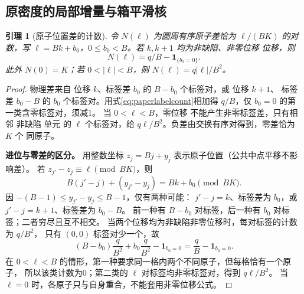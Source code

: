 \documentclass[UTF8,a4paper,11pt,fontset=fandol]{ctexart}
\newtheorem{lemma}{引理}[section]
\theoremstyle{remark}
\begin{document}
\subsection{原密度的局部增量与箱平滑核}
\begin{lemma}[原子位置差的计数]\label{lem:paperphysicalcount}
令 $N(\ell)$ 为圆周有序原子差恰为 $\ell/(BK)$ 的对数，写
$\ell=Bk+b_0$，$0\le b_0<B$。若 $k,k+1$ 均为非缺陷、非零位移 位移，则
\[
 N(\ell)=q/B-\mathbf1_{\{b_0=0\}}.
\]
此外 $N(0)=K$；若 $0<|\ell|<B$，则 $N(\ell)=q|\ell|/B^2$。
\end{lemma}
\begin{proof}
物理差来自 位移 $k$、标签差 $b_0$ 的 $B-b_0$ 个标签对，或 位移 $k+1$、
标签差 $b_0-B$ 的 $b_0$ 个标签对。用式\eqref{eq:paperlabelcount}相加得
$q/B$，仅 $b_0=0$ 的第一类含零标签对，须减1。
当 $0<\ell<B$，零位移 不能产生非零标签差，只有相邻 非缺陷 单元
的 $\ell$ 个标签对，给 $q\ell/B^2$。负差由交换有序对得到，零差恰为 $K$ 个 同原子。

\medskip\noindent\textbf{进位与零差的区分。}
用整数坐标 $z_j=Bj+y_j$ 表示原子位置（公共中点平移不影响差）。
若 $z_{j'}-z_j\equiv\ell\pmod{BK}$，则
\[
 B(j'-j)+(y_{j'}-y_j)=Bk+b_0\pmod{BK}.
\]
因 $-(B-1)\le y_{j'}-y_j\le B-1$，仅有两种可能：
$j'-j=k$、标签差为 $b_0$，或 $j'-j=k+1$、标签差为 $b_0-B$。
前一种有 $B-b_0$ 对标签，后一种有 $b_0$ 对标签；二者穷尽且互不相交。
当两个位移均为非缺陷非零位移时，每对标签的计数为 $q/B^2$，
只有 $(0,0)$ 标签对少一个，故
\[
 (B-b_0)\frac q{B^2}+b_0\frac q{B^2}-\mathbf1_{b_0=0}
 =\frac qB-\mathbf1_{b_0=0}.
\]
在 $0<\ell<B$ 的情形，第一种要求同一格内两个不同原子，但每格恰有一个原子，
所以该类计数为0；第二类的 $\ell$ 对标签均非零标签对，得到 $q\ell/B^2$。
当 $\ell=0$ 时，各原子只与自身重合，不能套用非零位移公式。

\end{proof}
\end{document}
